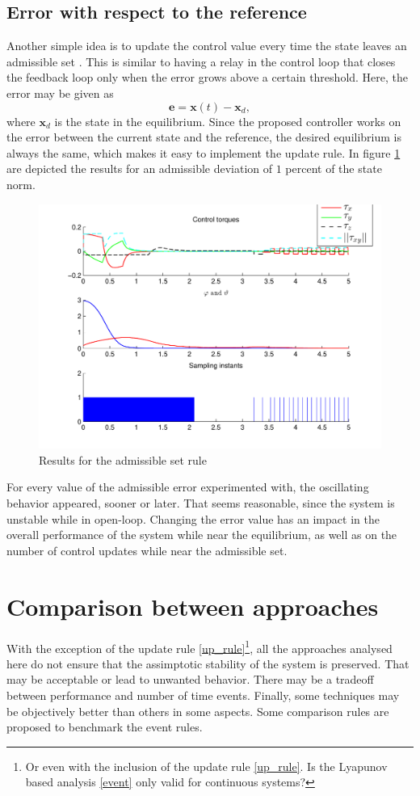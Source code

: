 \documentclass{article}
\begin{document}
		\subsection{Error with respect to the reference}
			Another simple idea is to update the control value every time the state leaves an admissible set \cite{astrom}. This is similar to having a relay in the control loop that closes the feedback loop only when the error grows above a certain threshold. Here, the error may be given as
			\[
				\mathbf{e} = \mathbf{x}(t) - \mathbf{x}_{d},
			\]
			where $\mathbf{x}_d$ is the state in the equilibrium. Since the proposed controller works on the error between the current state and the reference, the desired equilibrium is always the same, which makes it easy to implement the update rule. In figure \ref{event_results4} are depicted the results for an admissible deviation of $1$ percent of the state norm.
			\begin{figure}
				\centering
				\includegraphics[width=\textwidth]{event_4}
				\caption{Results for the admissible set rule\label{event_results4}}
			\end{figure}
			For every value of the admissible error experimented with, the oscillating behavior appeared, sooner or later. That seems reasonable, since the system is unstable while in open-loop. Changing the error value has an impact in the overall performance of the system while near the equilibrium, as well as on the number of control updates while near the admissible set.
			
	\section{Comparison between approaches}
		With the exception of the update rule \eqref{up_rule}\footnote{Or even with the inclusion of the update rule \eqref{up_rule}. Is the Lyapunov based analysis \eqref{event} only valid for continuous systems? }, all the approaches analysed here do not ensure that the assimptotic stability of the system is preserved. That may be acceptable or lead to unwanted behavior. There may be a tradeoff between performance and number of time events. Finally, some techniques may be objectively better than others in some aspects. Some comparison rules are proposed to benchmark the event rules.
\end{document}
